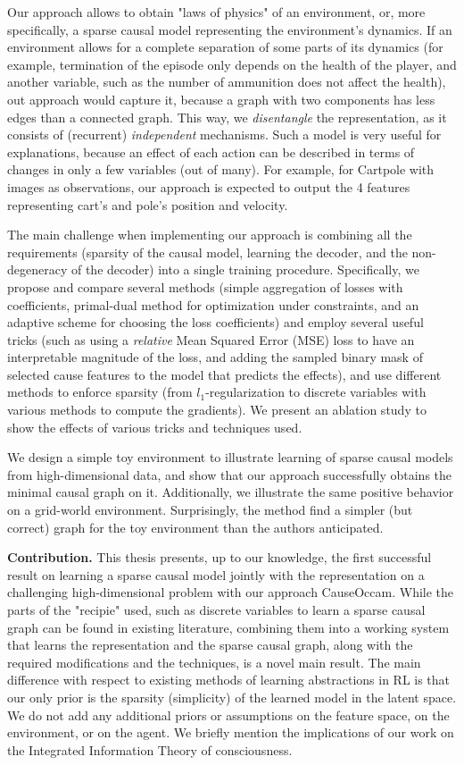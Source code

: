 \documentclass[a4paper,11pt,oneside]{report}
\newcommand{\sysname}{CauseOccam\xspace}
\begin{document}
Our approach allows to obtain "laws of physics" of an environment, or, more specifically, a sparse causal model representing the environment's dynamics.
If an environment allows for a complete separation of some parts of its dynamics (for example, termination of the episode only depends on the health of the player, and another variable, such as the number of ammunition does not affect the health), out approach would capture it, because a graph with two components has less edges than a connected graph. This way, we {\em disentangle} the representation, as it consists of (recurrent) {\em independent} mechanisms.
Such a model is very useful for explanations, because an effect of each action can be described in terms of changes in only a few variables (out of many). For example, for Cartpole with images as observations, our approach is expected to output the 4 features representing cart's and pole's position and velocity.

The main challenge when implementing our approach is combining all the requirements (sparsity of the causal model, learning the decoder, and the non-degeneracy of the decoder) into a single training procedure. Specifically, we propose and compare several methods (simple aggregation of losses with coefficients, primal-dual method for optimization under constraints, and an adaptive scheme for choosing the loss coefficients) and employ several useful tricks (such as using a {\em relative} Mean Squared Error (MSE) loss to have an interpretable magnitude of the loss, and adding the sampled binary mask of selected cause features to the model that predicts the effects), and use different methods to enforce sparsity (from $l_1$-regularization to discrete variables with various methods to compute the gradients). We present an ablation study to show the effects of various tricks and techniques used.

We design a simple toy environment to illustrate learning of sparse causal models from high-dimensional data, and show that our approach successfully obtains the minimal causal graph on it. Additionally, we illustrate the same positive behavior on a grid-world environment. Surprisingly, the method find a simpler (but correct) graph for the toy environment than the authors anticipated.

{\bf Contribution.} This thesis presents, up to our knowledge, the first successful result on learning a sparse causal model jointly with the representation on a challenging high-dimensional problem with our approach \sysname. While the parts of the "recipie" used, such as discrete variables to learn a sparse causal graph can be found in existing literature, combining them into a working system that learns the representation and the sparse causal graph, along with the required modifications and the techniques, is a novel main result. The main difference with respect to existing methods of learning abstractions in RL is that our only prior is the sparsity (simplicity) of the learned model in the latent space. We do not add any additional priors or assumptions on the feature space, on the environment, or on the agent. We briefly mention the implications of our work on the Integrated Information Theory of consciousness.
\end{document}
